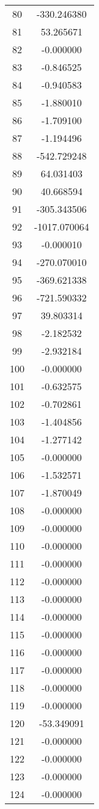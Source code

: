 \documentclass[12pt]{article}
\begin{document}
\begin{longtable}{@{}cc@{}}
80 & -330.246380 \\
81 & 53.265671 \\
82 & -0.000000 \\
83 & -0.846525 \\
84 & -0.940583 \\
85 & -1.880010 \\
86 & -1.709100 \\
87 & -1.194496 \\
88 & -542.729248 \\
89 & 64.031403 \\
90 & 40.668594 \\
91 & -305.343506 \\
92 & -1017.070064 \\
93 & -0.000010 \\
94 & -270.070010 \\
95 & -369.621338 \\
96 & -721.590332 \\
97 & 39.803314 \\
98 & -2.182532 \\
99 & -2.932184 \\
100 & -0.000000 \\
101 & -0.632575 \\
102 & -0.702861 \\
103 & -1.404856 \\
104 & -1.277142 \\
105 & -0.000000 \\
106 & -1.532571 \\
107 & -1.870049 \\
108 & -0.000000 \\
109 & -0.000000 \\
110 & -0.000000 \\
111 & -0.000000 \\
112 & -0.000000 \\
113 & -0.000000 \\
114 & -0.000000 \\
115 & -0.000000 \\
116 & -0.000000 \\
117 & -0.000000 \\
118 & -0.000000 \\
119 & -0.000000 \\
120 & -53.349091 \\
121 & -0.000000 \\
122 & -0.000000 \\
123 & -0.000000 \\
124 & -0.000000 \\

\end{longtable}
\end{document}
